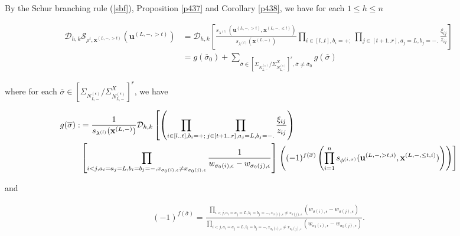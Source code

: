 \documentclass[11pt]{amsart}
\theoremstyle{plain}
\theoremstyle{definition}
\theoremstyle{remark}
\newcommand\ol{\overline}
\newcommand\si{\sigma}
\numberwithin{equation}{section}
\numberwithin{theorem}{section}
\numberwithin{figure}{section}
\begin{document}
By the Schur branching rule (\ref{sbf}), Proposition \ref{p437} and Corollary \ref{p438}, we have for each $1\leq h\leq n$
\begin{small}
\begin{align*}
\mathcal{D}_{h,k}\mathcal{S}_{\rho^t,\mathbf{x}^{(L,-,> t)}}(\mathbf{u}^{(L,-,> t)})
&=\mathcal{D}_{h,k} \left[\frac{s_{\lambda^{(l)}}\left(\mathbf{u}^{(L,-,> t)},\mathbf{x}^{(L,-,\leq t)}\right)}{s_{\lambda^{(l)}}(\mathbf{x}^{(L,-)})}\prod_{i\in[l..t],b_i=+;}
\prod_{j\in[t+1..r],a_j=L,b_j=-.}\frac{\xi_{ij}}{z_{ij}}\right]\\
&=g(\ol{\si}_0)+
\sum_{\ol{\si}\in\left[\Sigma_{N_{L,-}^{(\epsilon)}}/\Sigma_{N_{L,-}^{(\epsilon)}}^X\right]^r,\ol{\si}\neq\ol{\si}_0}g(\ol{\si})
\end{align*}
\end{small}
where for each $\ol{\si}\in\left[\Sigma_{N_{L,-}^{(\epsilon)}}/\Sigma_{N_{L,-}^{(\epsilon)}}^X\right]^r$, we have
\begin{small}
\begin{align*}
g(\ol{\si}):&=\frac{1}{s_{\lambda^{(l)}}(\mathbf{x}^{(L,-)})}
\mathcal{D}_{h,k} \left[\left(\prod_{i\in[l..t],b_i=+;}
\prod_{j\in[t+1..r],a_j=L,b_j=-.}\frac{\xi_{ij}}{z_{ij}}\right)\right.\\
\notag&\left[\prod_{i<j,a_i=a_j=L,b_i=b_j=-,x_{\si_0(i),\epsilon}\neq x_{\si_0(j),\epsilon}}\frac{1}{w_{\si_0(i),\epsilon}-w_{\si_0(j),\epsilon}}\right]\left.\left((-1)^{f(\ol{\si})}\left(\prod_{i=1}^{n}s_{\phi^{(i,\sigma)}}(\mathbf{u}^{(L,-,>t,i)},\mathbf{x}^{(L,-,\leq t,i)})\right)
\right)
\right]
\end{align*}
\end{small}
and
\begin{small}
\begin{align*}
(-1)^{f(\ol{\si})}=\frac{\prod_{i<j,a_i=a_j=L,b_i=b_j=-,x_{\si(i),\epsilon}\neq x_{\si(j),\epsilon}}\left(w_{\si(i),\epsilon}-w_{\si(j),\epsilon}\right)}{\prod_{i<j,a_i=a_j=L,b_i=b_j=-,x_{\si_0(i),\epsilon}\neq x_{\si_0(j),\epsilon}}\left(w_{\si_0(i),\epsilon}-w_{\si_0(j),\epsilon}\right)}.
\end{align*}
\end{small}
\end{document}
